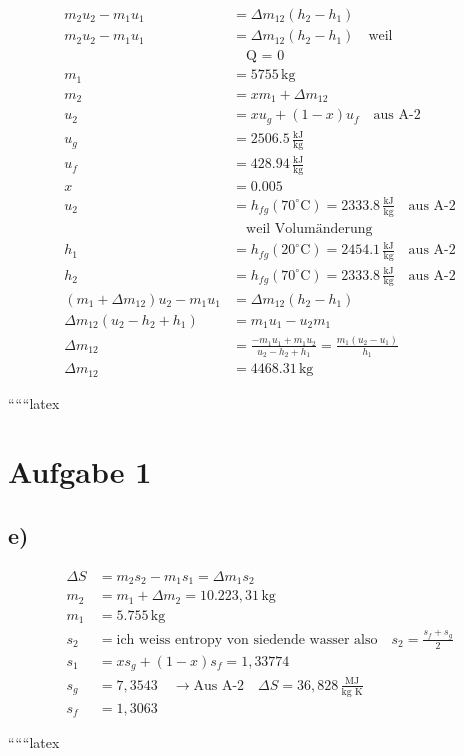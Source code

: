 \begin{align*}
    m_2 u_2 - m_1 u_1 &= \Delta m_{12} (h_2 - h_1) \\
    m_2 u_2 - m_1 u_1 &= \Delta m_{12} (h_2 - h_1) \quad \text{weil} \\
    &\quad \text{Q = 0} \\
    m_1 &= 5755 \, \text{kg} \\
    m_2 &= x m_1 + \Delta m_{12} \\
    u_2 &= x u_g + (1 - x) u_f \quad \text{aus A-2} \\
    u_g &= 2506.5 \, \frac{\text{kJ}}{\text{kg}} \\
    u_f &= 428.94 \, \frac{\text{kJ}}{\text{kg}} \\
    x &= 0.005 \\
    u_2 &= h_{fg} (70^\circ \text{C}) = 2333.8 \, \frac{\text{kJ}}{\text{kg}} \quad \text{aus A-2} \\
    &\quad \text{weil Volumänderung} \\
    h_1 &= h_{fg} (20^\circ \text{C}) = 2454.1 \, \frac{\text{kJ}}{\text{kg}} \quad \text{aus A-2} \\
    h_2 &= h_{fg} (70^\circ \text{C}) = 2333.8 \, \frac{\text{kJ}}{\text{kg}} \quad \text{aus A-2} \\
    (m_1 + \Delta m_{12}) u_2 - m_1 u_1 &= \Delta m_{12} (h_2 - h_1) \\
    \Delta m_{12} (u_2 - h_2 + h_1) &= m_1 u_1 - u_2 m_1 \\
    \Delta m_{12} &= \frac{-m_1 u_1 + m_1 u_2}{u_2 - h_2 + h_1} = \frac{m_1 (u_2 - u_1)}{h_1} \\
    \Delta m_{12} &= 4468.31 \, \text{kg}
\end{align*}

``````latex


\section*{Aufgabe 1}

\subsection*{e)}
\begin{align*}
\Delta S &= m_2 s_2 - m_1 s_1 = \Delta m_1 s_2 \\
m_2 &= m_1 + \Delta m_2 = 10.223,31 \, \text{kg} \\
m_1 &= 5.755 \, \text{kg} \\
s_2 &= \text{ich weiss entropy von siedende wasser also} \quad s_2 = \frac{s_f + s_g}{2} \\
s_1 &= x s_g + (1 - x) s_f = 1,33774 \\
s_g &= 7,3543 \quad \rightarrow \text{Aus A-2} \quad \Delta S = 36,828 \, \frac{\text{MJ}}{\text{kg K}} \\
s_f &= 1,3063
\end{align*}

``````latex


